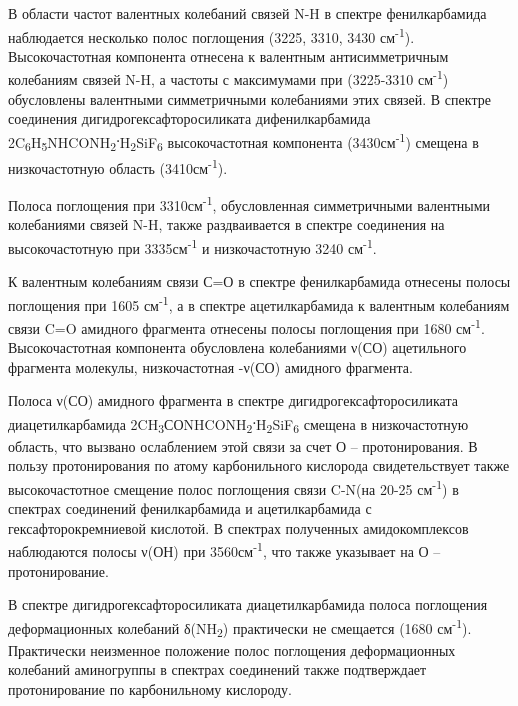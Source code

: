 \begin{multicols}{2}
В области частот валентных колебаний связей N-H в спектре фенилкарбамида
наблюдается несколько полос поглощения (3225, 3310, 3430
см\textsuperscript{-1}). Высокочастотная компонента отнесена к валентным
антисимметричным колебаниям связей N-H, а частоты с максимумами при
(3225-3310 см\textsuperscript{-1}) обусловлены валентными симметричными
колебаниями этих связей. В спектре соединения дигидрогексафторосиликата
дифенилкарбамида
2C\textsubscript{6}H\textsubscript{5}NHCONH\textsubscript{2}{\bfseries \textsuperscript{.}}H\textsubscript{2}SiF\textsubscript{6}
высокочастотная компонента (3430см\textsuperscript{-1}) смещена в
низкочастотную область (3410см\textsuperscript{-1}).

Полоса поглощения при 3310см\textsuperscript{-1}, обусловленная
симметричными валентными колебаниями связей N-H, также раздваивается в
спектре соединения на высокочастотную при 3335см\textsuperscript{-1} и
низкочастотную 3240 см\textsuperscript{-1}.

К валентным колебаниям связи С=О в спектре фенилкарбамида отнесены
полосы поглощения при 1605 см\textsuperscript{-1}, а в спектре
ацетилкарбамида к валентным колебаниям связи C=O амидного фрагмента
отнесены полосы поглощения при 1680 см\textsuperscript{-1}.
Высокочастотная компонента обусловлена колебаниями ν(СО) ацетильного
фрагмента молекулы, низкочастотная -ν(СО) амидного фрагмента.

Полоса ν(СО) амидного фрагмента в спектре дигидрогексафторосиликата
диацетилкарбамида
2CH\textsubscript{3}СОNHCONH\textsubscript{2}{\bfseries \textsuperscript{.}}H\textsubscript{2}SiF\textsubscript{6}
смещена в низкочастотную область, что вызвано ослаблением этой связи за
счет О -- протонирования. В пользу протонирования по атому карбонильного
кислорода свидетельствует также высокочастотное смещение полос
поглощения связи C-N(на 20-25 см\textsuperscript{-1}) в спектрах
соединений фенилкарбамида и ацетилкарбамида с гексафторокремниевой
кислотой. В спектрах полученных амидокомплексов наблюдаются полосы ν(ОН)
при 3560см\textsuperscript{-1}, что также указывает на О --
протонирование.

В спектре дигидрогексафторосиликата диацетилкарбамида полоса поглощения
деформационных колебаний δ(NH\textsubscript{2}) практически не смещается
(1680 см\textsuperscript{-1}). Практически неизменное положение полос
поглощения деформационных колебаний аминогруппы в спектрах соединений
также подтверждает протонирование по карбонильному кислороду.


\end{multicols}

